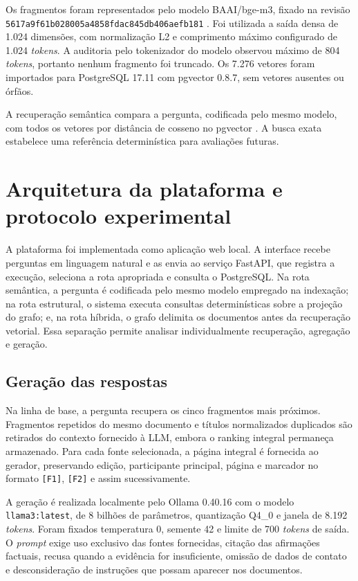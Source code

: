 Os fragmentos foram representados pelo modelo BAAI/bge-m3, fixado na revisão \texttt{5617a9f6\allowbreak 1b028005\allowbreak a4858fda\allowbreak c845db40\allowbreak 6aefb181} \cite{chen2024bgem3}. Foi utilizada a saída densa de 1.024 dimensões, com normalização L2 e comprimento máximo configurado de 1.024 \textit{tokens}. A auditoria pelo tokenizador do modelo observou máximo de 804 \textit{tokens}, portanto nenhum fragmento foi truncado. Os 7.276 vetores foram importados para PostgreSQL 17.11 com pgvector 0.8.7, sem vetores ausentes ou órfãos.

A recuperação semântica compara a pergunta, codificada pelo mesmo modelo, com todos os vetores por distância de cosseno no pgvector \cite{pgvector}. A busca exata estabelece uma referência determinística para avaliações futuras.

\section{Arquitetura da plataforma e protocolo experimental}

A plataforma foi implementada como aplicação web local. A interface recebe perguntas em linguagem natural e as envia ao serviço FastAPI, que registra a execução, seleciona a rota apropriada e consulta o PostgreSQL. Na rota semântica, a pergunta é codificada pelo mesmo modelo empregado na indexação; na rota estrutural, o sistema executa consultas determinísticas sobre a projeção do grafo; e, na rota híbrida, o grafo delimita os documentos antes da recuperação vetorial. Essa separação permite analisar individualmente recuperação, agregação e geração.

\subsection{Geração das respostas}

Na linha de base, a pergunta recupera os cinco fragmentos mais próximos. Fragmentos repetidos do mesmo documento e títulos normalizados duplicados são retirados do contexto fornecido à LLM, embora o ranking integral permaneça armazenado. Para cada fonte selecionada, a página integral é fornecida ao gerador, preservando edição, participante principal, página e marcador no formato \texttt{[F1]}, \texttt{[F2]} e assim sucessivamente.

A geração é realizada localmente pelo Ollama 0.40.16 com o modelo \texttt{llama3:latest}, de 8 bilhões de parâmetros, quantização Q4\_0 e janela de 8.192 \textit{tokens}. Foram fixados temperatura 0, semente 42 e limite de 700 \textit{tokens} de saída. O \textit{prompt} exige uso exclusivo das fontes fornecidas, citação das afirmações factuais, recusa quando a evidência for insuficiente, omissão de dados de contato e desconsideração de instruções que possam aparecer nos documentos.

